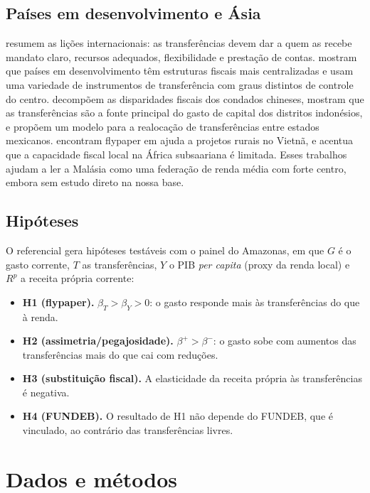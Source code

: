 \documentclass[10pt,twocolumn]{article}
\begin{document}
\subsection{Países em desenvolvimento e Ásia}
\citet{bird2002} resumem as lições internacionais: as transferências devem dar a quem as recebe mandato claro, recursos adequados, flexibilidade e prestação de contas. \citet{bahl1994} mostram que países em desenvolvimento têm estruturas fiscais mais centralizadas e usam uma variedade de instrumentos de transferência com graus distintos de controle do centro. \citet{tsui2005} decompõem as disparidades fiscais dos condados chineses, \citet{aritenang2020} mostram que as transferências são a fonte principal do gasto de capital dos distritos indonésios, e \citet{guerrero2022} propõem um modelo para a realocação de transferências entre estados mexicanos. \citet{vandewalle2007} encontram flypaper em ajuda a projetos rurais no Vietnã, e \citet{masaki2018} acentua que a capacidade fiscal local na África subsaariana é limitada. Esses trabalhos ajudam a ler a Malásia como uma federação de renda média com forte centro, embora sem estudo direto na nossa base.

\subsection{Hipóteses}
O referencial gera hipóteses testáveis com o painel do Amazonas, em que $G$ é o gasto corrente, $T$ as transferências, $Y$ o PIB \textit{per capita} (proxy da renda local) e $R^p$ a receita própria corrente:
\begin{itemize}\setlength{\itemsep}{0pt}
\item \textbf{H1 (flypaper).} $\beta_T>\beta_Y>0$: o gasto responde mais às transferências do que à renda.
\item \textbf{H2 (assimetria/pegajosidade).} $\beta^{+}>\beta^{-}$: o gasto sobe com aumentos das transferências mais do que cai com reduções.
\item \textbf{H3 (substituição fiscal).} A elasticidade da receita própria às transferências é negativa.
\item \textbf{H4 (FUNDEB).} O resultado de H1 não depende do FUNDEB, que é vinculado, ao contrário das transferências livres.
\end{itemize}

\section{Dados e métodos}\label{sec:dados}
\end{document}
